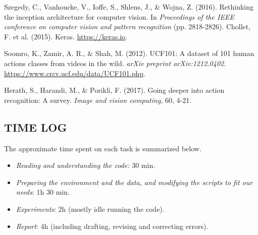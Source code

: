 \documentclass[letterpaper, 10 pt, conference]{IEEEtran}
\begin{document}
\begin{thebibliography}{99}

 Szegedy, C., Vanhoucke, V., Ioffe, S., Shlens, J., \& Wojna, Z. (2016). Rethinking the inception architecture for computer vision. In \textit{Proceedings of the IEEE conference on computer vision and pattern recognition} (pp. 2818-2826).
 Chollet, F. et al. (2015). Keras. \url{https://keras.io}.

 Soomro, K., Zamir, A. R., \& Shah, M. (2012). UCF101: A dataset of 101 human actions classes from videos in the wild. \textit{arXiv preprint arXiv:1212.0402}. \url{https://www.crcv.ucf.edu/data/UCF101.php}.

 Herath, S., Harandi, M., \& Porikli, F. (2017). Going deeper into action recognition: A survey. \textit{Image and vision computing}, 60, 4-21.
\end{thebibliography}


\appendix

\subsection{TIME LOG}

The approximate time spent on each task is summarized below.

\begin{itemize}
  \item \textit{Reading and understanding the code:} 30 min.
  \item \textit{Preparing the environment and the data, and modifying the scripts to fit our needs}: 1h 30 min.
  \item \textit{Experiments}: 2h (mostly idle running the code).
  \item \textit{Report}: 4h (including drafting, revising and correcting errors).
\end{itemize}
\end{document}

